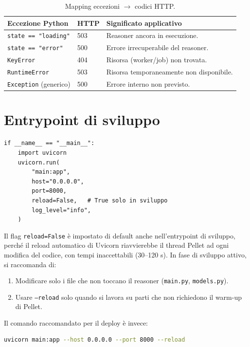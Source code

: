 \documentclass[a4paper,12pt]{article}
\begin{document}
\begin{table}[H]
\centering
\caption{Mapping eccezioni $\rightarrow$ codici HTTP.}
\begin{tabular}{L{3.5cm} C{2cm} L{6.5cm}}
\toprule
\textbf{Eccezione Python} & \textbf{HTTP} & \textbf{Significato applicativo} \\
\midrule
\texttt{state == "loading"} & 503 & Reasoner ancora in esecuzione. \\
\texttt{state == "error"}   & 500 & Errore irrecuperabile del reasoner. \\
\texttt{KeyError}           & 404 & Risorsa (worker/job) non trovata. \\
\texttt{RuntimeError}       & 503 & Risorsa temporaneamente non disponibile. \\
\texttt{Exception} (generico) & 500 & Errore interno non previsto. \\
\bottomrule
\end{tabular}
\end{table}

\section{Entrypoint di sviluppo}

\begin{lstlisting}[caption={Avvio diretto con Uvicorn per lo sviluppo.}]
if __name__ == "__main__":
    import uvicorn
    uvicorn.run(
        "main:app",
        host="0.0.0.0",
        port=8000,
        reload=False,   # True solo in sviluppo
        log_level="info",
    )
\end{lstlisting}

\noindent Il flag \texttt{reload=False} \`{e} impostato di default anche nell'entrypoint
di sviluppo, perch\'{e} il reload automatico di Uvicorn riavvierebbe
il thread Pellet ad ogni modifica del codice, con tempi inaccettabili
(30--120 s). In fase di sviluppo attivo, si raccomanda di:
\begin{enumerate}
  \item Modificare solo i file che non toccano il reasoner
        (\texttt{main.py}, \texttt{models.py}).
  \item Usare \texttt{--reload} solo quando si lavora su parti
        che non richiedono il warm-up di Pellet.
\end{enumerate}

Il comando raccomandato per il deploy \`{e} invece:
\begin{lstlisting}[language=bash, caption={Comando di avvio in produzione.}]
uvicorn main:app --host 0.0.0.0 --port 8000 --reload
\end{lstlisting}
\end{document}
